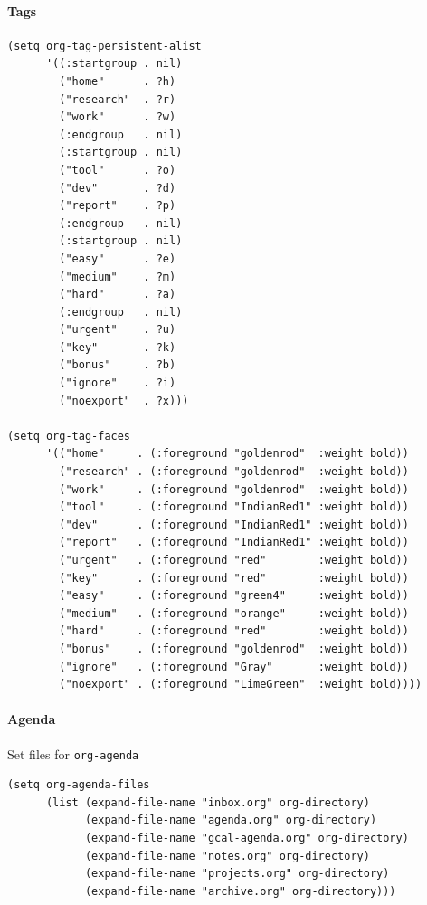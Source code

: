 \documentclass[11pt]{article}
\begin{document}
\paragraph{Tags}
\label{sec:orgf15994f}

\begin{verbatim}
(setq org-tag-persistent-alist
      '((:startgroup . nil)
        ("home"      . ?h)
        ("research"  . ?r)
        ("work"      . ?w)
        (:endgroup   . nil)
        (:startgroup . nil)
        ("tool"      . ?o)
        ("dev"       . ?d)
        ("report"    . ?p)
        (:endgroup   . nil)
        (:startgroup . nil)
        ("easy"      . ?e)
        ("medium"    . ?m)
        ("hard"      . ?a)
        (:endgroup   . nil)
        ("urgent"    . ?u)
        ("key"       . ?k)
        ("bonus"     . ?b)
        ("ignore"    . ?i)
        ("noexport"  . ?x)))

(setq org-tag-faces
      '(("home"     . (:foreground "goldenrod"  :weight bold))
        ("research" . (:foreground "goldenrod"  :weight bold))
        ("work"     . (:foreground "goldenrod"  :weight bold))
        ("tool"     . (:foreground "IndianRed1" :weight bold))
        ("dev"      . (:foreground "IndianRed1" :weight bold))
        ("report"   . (:foreground "IndianRed1" :weight bold))
        ("urgent"   . (:foreground "red"        :weight bold))
        ("key"      . (:foreground "red"        :weight bold))
        ("easy"     . (:foreground "green4"     :weight bold))
        ("medium"   . (:foreground "orange"     :weight bold))
        ("hard"     . (:foreground "red"        :weight bold))
        ("bonus"    . (:foreground "goldenrod"  :weight bold))
        ("ignore"   . (:foreground "Gray"       :weight bold))
        ("noexport" . (:foreground "LimeGreen"  :weight bold))))

\end{verbatim}

\paragraph{Agenda}
\label{sec:orgf34fa12}
Set files for \texttt{org-agenda}

\begin{verbatim}
(setq org-agenda-files
      (list (expand-file-name "inbox.org" org-directory)
            (expand-file-name "agenda.org" org-directory)
            (expand-file-name "gcal-agenda.org" org-directory)
            (expand-file-name "notes.org" org-directory)
            (expand-file-name "projects.org" org-directory)
            (expand-file-name "archive.org" org-directory)))
\end{verbatim}
\end{document}
